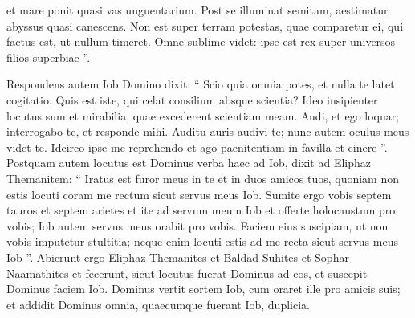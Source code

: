 \begin{biblechapter}
\begin{biblechapter}
\begin{biblechapter}
\begin{biblechapter}
\begin{biblechapter}
\begin{biblechapter}
\begin{biblechapter}
\begin{biblechapter}
\begin{biblechapter}
\begin{biblechapter}
\begin{biblechapter}
\begin{biblechapter}
\begin{biblechapter}
\begin{biblechapter}
\begin{biblechapter}
\begin{biblechapter}
\begin{biblechapter}
\begin{biblechapter}
\begin{biblechapter}
\begin{biblechapter}
\begin{biblechapter}
\begin{biblechapter}
\begin{biblechapter}
\begin{biblechapter}
\begin{biblechapter}
\begin{biblechapter}
\begin{biblechapter}
\begin{biblechapter}
\begin{biblechapter}
\begin{biblechapter}
\begin{biblechapter}
\begin{biblechapter}
\begin{biblechapter}
\begin{biblechapter}
\begin{biblechapter}
\begin{biblechapter}
\begin{biblechapter}
\begin{biblechapter}
\begin{biblechapter}
\begin{biblechapter}
\begin{biblechapter}
 et mare ponit quasi vas unguentarium.
 \verse Post se illuminat semitam,
 aestimatur abyssus quasi canescens.
 \verse Non est super terram potestas, quae comparetur ei,
 qui factus est, ut nullum timeret.
 \verse Omne sublime videt:
 ipse est rex super universos filios superbiae ”.
 
\begin{biblechapter}
\verse Respondens autem Iob Domino dixit:
 \verse “ Scio quia omnia potes,
 et nulla te latet cogitatio.
 \verse Quis est iste, qui celat consilium
 absque scientia?
 Ideo insipienter locutus sum
 et mirabilia, quae excederent scientiam meam.
 \verse Audi, et ego loquar;
 interrogabo te, et responde mihi.
 \verse Auditu auris audivi te;
 nunc autem oculus meus videt te.
 \verse Idcirco ipse me reprehendo
 et ago paenitentiam in favilla et cinere ”.
 \verse Postquam autem locutus est Dominus verba haec ad Iob, dixit ad Eliphaz Themanitem: “ Iratus est furor meus in te et in duos amicos tuos, quoniam non estis locuti coram me rectum sicut servus meus Iob. 
\verse Sumite ergo vobis septem tauros et septem arietes et ite ad servum meum Iob et offerte holocaustum pro vobis; Iob autem servus meus orabit pro vobis. Faciem eius suscipiam, ut non vobis imputetur stultitia; neque enim locuti estis ad me recta sicut servus meus Iob ”. 
\verse Abierunt ergo Eliphaz Themanites et Baldad Suhites et Sophar Naamathites et fecerunt, sicut locutus fuerat Dominus ad eos, et suscepit Dominus faciem Iob.
 \verse Dominus vertit sortem Iob, cum oraret ille pro amicis suis; et addidit Dominus omnia, quaecumque fuerant Iob, duplicia. 

\end{biblechapter}
\end{biblechapter}
\end{biblechapter}
\end{biblechapter}
\end{biblechapter}
\end{biblechapter}
\end{biblechapter}
\end{biblechapter}
\end{biblechapter}
\end{biblechapter}
\end{biblechapter}
\end{biblechapter}
\end{biblechapter}
\end{biblechapter}
\end{biblechapter}
\end{biblechapter}
\end{biblechapter}
\end{biblechapter}
\end{biblechapter}
\end{biblechapter}
\end{biblechapter}
\end{biblechapter}
\end{biblechapter}
\end{biblechapter}
\end{biblechapter}
\end{biblechapter}
\end{biblechapter}
\end{biblechapter}
\end{biblechapter}
\end{biblechapter}
\end{biblechapter}
\end{biblechapter}
\end{biblechapter}
\end{biblechapter}
\end{biblechapter}
\end{biblechapter}
\end{biblechapter}
\end{biblechapter}
\end{biblechapter}
\end{biblechapter}
\end{biblechapter}
\end{biblechapter}
